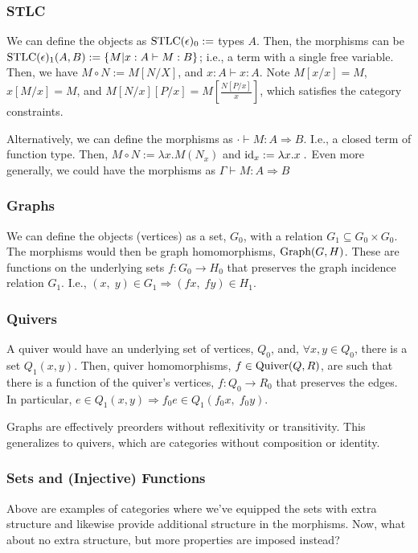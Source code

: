 \documentclass[12pt]{article}
\begin{document}
\subsubsection{STLC}

We can define the objects as $\textmd{STLC}(\epsilon)_0 :=$ types $A$. Then, the morphisms can be $\textmd{STLC}(\epsilon)_1(A,B) := \{M | x:A \vdash M :B \}$; i.e., a term with a single free variable. Then, we have $M \circ N := M[N/X]$, and $x:A \vdash x:A$. Note $M[x/x] = M$, $x[M/x] = M$, and $M[N/x][P/x] = M\left[\frac{N[P/x]}{x}\right]$, which satisfies the category constraints.


Alternatively, we can define the morphisms as $\cdot \vdash M: A \Rightarrow B$. I.e., a closed term of function type. Then, $M \circ N := \lambda x . M(N_x)$ and $\textmd{id}_x := \lambda x . x\;.$ Even more generally, we could have the morphisms as $\Gamma \vdash M : A \Rightarrow B$

\subsubsection{Graphs}
We can define the objects (vertices) as a set, $G_0$, with a relation $G_1 \subseteq G_0 \times G_0$. The morphisms would then be graph homomorphisms, $\textmd{Graph}(G,H)$. These are functions on the underlying sets $f:G_0 \rightarrow H_0$ that preserves the graph incidence relation $G_1$. I.e., $(x,\;y) \in G_1 \Rightarrow (fx,\;fy) \in H_1$.

\subsubsection{Quivers}
A quiver would have an underlying set of vertices, $Q_0$, and, $\forall x,y \in Q_0$, there is a set $Q_1(x,y)$. Then, quiver homomorphisms, $f \in \textmd{Quiver}(Q,R)$, are such that there is a function of the quiver's vertices, $f: Q_0 \rightarrow R_0$ that preserves the edges. In particular, $e \in Q_1(x,y) \Rightarrow f_0e \in Q_1(f_0x,\;f_0y)$.

Graphs are effectively preorders without reflexitivity or transitivity. This generalizes to quivers, which are categories without composition or identity.

\subsubsection{Sets and (Injective) Functions}
Above are examples of categories where we've equipped the sets with extra structure and likewise provide additional structure in the morphisms. Now, what about no extra structure, but more properties are imposed instead?
\end{document}
